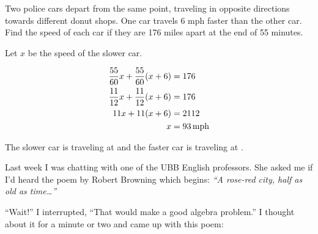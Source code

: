 \documentclass[letterpaper, landscape]{exam}
\begin{document}
\begin{questions}




    \question{}
      Two police cars depart from the same point, traveling in opposite directions towards different donut shops. One
      car travels 6 mph faster than the other car.  Find the speed of each car if they are 176 miles apart at the end of
      55 minutes.

      \begin{solution}
        Let $x$ be the speed of the slower car.

        \begin{align*}
          \frac{55}{60} x + \frac{55}{60}(x + 6) & = 176 \\
          \frac{11}{12} x + \frac{11}{12}(x + 6) & = 176 \\
          11x + 11(x + 6)                        & = 2112 \\
          x                                      & = \unit[93]{mph} \\
        \end{align*}

        The slower car is traveling at  and the faster car is traveling at .

      \end{solution}

    \ifprintanswers{}
    \else
      \newpage
    \fi

    \question{}
      Last week I was chatting with one of the UBB English professors.  She asked me if I'd heard the poem by Robert
      Browning which begins: {\em ``A rose-red city, half as old as time\ldots ''\/}

      ``Wait!'' I interrupted,  ``That would make a good algebra problem.''  I thought about it for a minute or two and
      came up with this poem:


\end{questions}
\end{document}
